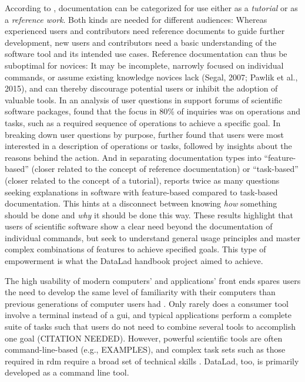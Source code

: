 According to \citet{Parnas2011}, documentation can be categorized for use either as a \textit{tutorial} or as a \textit{reference work}.
Both kinds are needed for different audiences: Whereas experienced users and contributors need reference documents to guide further development, new users and contributors need a basic understanding of the software tool and its intended use cases.
Reference documentation can thus be suboptimal for novices: It may be incomplete, narrowly focused on individual commands, or assume existing knowledge novices lack (Segal, 2007; Pawlik et al., 2015), and can thereby discourage potential users or inhibit the adoption of valuable tools.
In an analysis of user questions in support forums of scientific software packages, \citet{swarts2019open} found that the focus in 80\% of inquiries was on operations and tasks, such as a required sequence of operations to achieve a specific goal.
In breaking down user questions by purpose, \citet{swarts2019open} further found that users were most interested in a description of operations or tasks, followed by insights about the reasons behind the action.
And in separating documentation types into ``feature-based'' (closer related to the concept of reference documentation) or ``task-based'' (closer related to the concept of a tutorial),  \citet{swarts2019open} reports twice as many questions seeking explanations in software with feature-based compared to task-based documentation.
This hints at a disconnect between knowing \textit{how} something should be done and \textit{why} it should be done this way.
These results highlight that users of scientific software show a clear need beyond the documentation of individual commands, but seek to understand general usage principles and master complex combinations of features to achieve specified goals.
This type of empowerment is what the DataLad handbook project aimed to achieve.


The high usability of modern computers' and applications' front ends spares users the need to develop the same level of familiarity with their computers than previous generations of computer users had \citep{mehlenbacher2003documentation}.
Only rarely does a consumer tool involve a terminal instead of a \gls{gui}, and typical applications perform a complete suite of tasks such that users do not need to combine several tools to accomplish one goal (CITATION NEEDED).
However, powerful scientific tools are often command-line-based (e.g., EXAMPLES), and complex task sets such as those required in \gls{rdm} require a broad set of technical skills \citep{grisham2016proposed}.
DataLad, too, is primarily developed as a command line tool.

